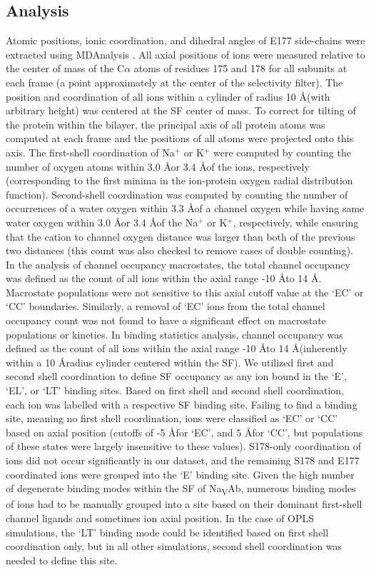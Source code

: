 \begin{refsection}
\subsection{Analysis} 
Atomic positions, ionic coordination, and dihedral angles of E177 side-chains were extracted using MDAnalysis \cite{MichaudAgrawal:2011fd}. All axial positions of ions were measured relative to the center of mass of the C$\alpha$ atoms of residues 175 and 178 for all subunits at each frame (a point approximately at the center of the selectivity filter). The position and coordination of all ions within a cylinder of radius 10 \AA (with arbitrary height) was centered at the SF center of mass. To correct for tilting of the protein within the bilayer, the principal axis of all protein atoms was computed at each frame and the positions of all atoms were projected onto this axis. 
The first-shell coordination of Na$^+$ or K$^+$ were computed by counting the number of oxygen atoms within 3.0 \AA or 3.4 \AA of the ions, respectively (corresponding to the first minima in the ion-protein oxygen radial distribution function). Second-shell coordination was computed by counting the number of occurrences of a water oxygen within 3.3 \AA of a channel oxygen while having same water oxygen within 3.0 \AA or 3.4 \AA of the Na$^+$ or K$^+$, respectively, while ensuring that the cation to channel oxygen distance was larger than both of the previous two distances (this count was also checked to remove cases of double counting). 
In the analysis of channel occupancy macrostates, the total channel occupancy was defined as the count of all ions within the axial range -10 \AA to 14 \AA. Macrostate populations were not sensitive to this axial cutoff value at the `EC' or `CC' boundaries. Similarly, a removal of `EC' ions from the total channel occupancy count was not found to have a significant effect on macrostate populations or kinetics.
In binding statistics analysis, channel occupancy was defined as the count of all ions within the axial range -10 \AA to 14 \AA (inherently within a 10 \AA radius cylinder centered within the SF). We utilized first and second shell coordination to define SF occupancy as any ion bound in the `E', `EL', or `LT' binding sites. Based on first shell and second shell coordination, each ion was labelled with a respective SF binding site. Failing to find a binding site, meaning no first shell coordination, ions were classified as `EC' or `CC' based on axial position (cutoffs of -5 \AA for `EC', and 5 \AA for `CC', but populations of these states were largely insensitive to these values). S178-only coordination of ions did not occur significantly in our dataset, and the remaining S178 and E177 coordinated ions were grouped into the `E' binding site. Given the high number of degenerate binding modes within the SF of Na\textsubscript{V}Ab, numerous binding modes of ions had to be manually grouped into a site based on their dominant first-shell channel ligands and sometimes ion axial position. In the case of OPLS simulations, the `LT' binding mode could be identified based on first shell coordination only, but in all other simulations, second shell coordination was needed to define this site. 

\end{refsection}
